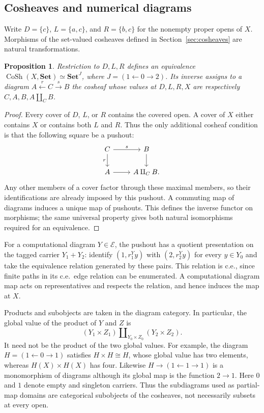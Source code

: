 \documentclass[11pt]{article}
\newtheorem{proposition}[theorem]{Proposition}
\begin{document}
\subsection{Cosheaves and numerical diagrams}

Write $D=\{c\}$, $L=\{a,c\}$, and $R=\{b,c\}$ for the nonempty
proper opens of $X$. Morphisms of the set-valued cosheaves defined in
Section~\ref{sec:cosheaves} are natural transformations.

\begin{proposition}\label{prop:fork-cosheaves}
Restriction to $D,L,R$ defines an equivalence
$\operatorname{CoSh}(X,\mathbf{Set})\simeq\mathbf{Set}^{J}$,
where $J=(1\leftarrow0\to2)$. Its inverse assigns to a diagram
$A\xleftarrow{r}C\xrightarrow{s}B$ the cosheaf whose values at
$D,L,R,X$ are respectively $C,A,B,A\amalg_C B$.
\end{proposition}
\begin{proof}
Every cover of $D$, $L$, or $R$ contains the covered open. A cover
of $X$ either contains $X$ or contains both $L$ and $R$. Thus the
only additional cosheaf condition is that the following square be
a pushout:
\[
\begin{tikzcd}
C\arrow[r,"s"]\arrow[d,"r"']&B\arrow[d]\\
A\arrow[r]&A\amalg_C B.
\end{tikzcd}
\]
Any other members of a cover factor through these maximal members,
so their identifications are already imposed by this pushout.
A commuting map of diagrams induces a unique map of pushouts.
This defines the inverse functor on morphisms; the same universal
property gives both natural isomorphisms required for an equivalence.
\end{proof}

For a computational diagram $Y\in\mathcal E$, the pushout has a
quotient presentation on the tagged carrier $Y_1+Y_2$: identify
$(1,r_1^Yy)$ with $(2,r_2^Yy)$ for every $y\in Y_0$ and take the
equivalence relation generated by these pairs. This relation is c.e.,
since finite paths in its c.e.\ edge relation can be enumerated.
A computational diagram map acts on representatives and respects the
relation, and hence induces the map at $X$.

Products and subobjects are taken in the diagram category. In
particular, the global value of the product of $Y$ and $Z$ is
\[
 (Y_1\times Z_1)\amalg_{Y_0\times Z_0}(Y_2\times Z_2).
\]
It need not be the product of the two global values. For example,
the diagram $H=(1\leftarrow0\to1)$ satisfies $H\times H\cong H$,
whose global value has two elements, whereas $H(X)\times H(X)$
has four. Likewise $H\to(1\leftarrow1\to1)$ is a monomorphism
of diagrams although its global map is the function $2\to1$.
Here $0$ and $1$ denote empty and singleton carriers. Thus the
subdiagrams used as partial-map domains are categorical subobjects
of the cosheaves, not necessarily subsets at every open.
\end{document}

